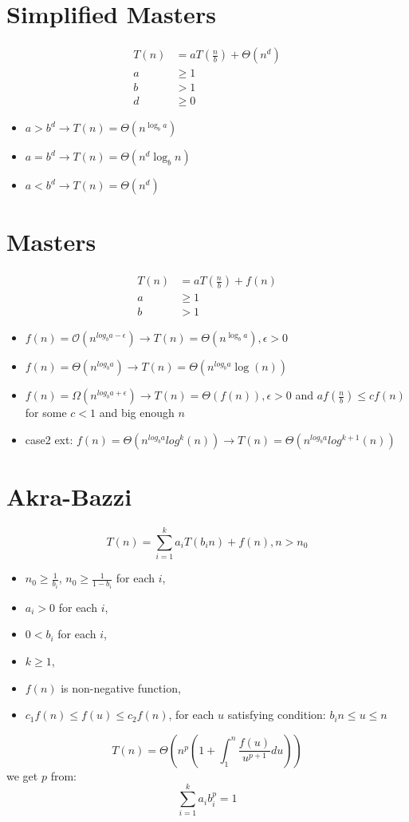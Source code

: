 
 

\begin{multicols}{5}
\setlength{\premulticols}{1pt}
\setlength{\postmulticols}{1pt}
\setlength{\multicolsep}{1pt}
\setlength{\columnsep}{2pt}

\section{Simplified Masters}
\begin{align*}
	T(n) &= aT(\frac{n}{b})+\Theta(n^d) \\
	a &\geq 1 \\
	b &> 1 \\
	d &\geq 0
\end{align*}
\begin{itemize}
	\item $a > b^d \rightarrow T(n) = \Theta(n^{\log_ba})$
	\item $a = b^d \rightarrow T(n) = \Theta(n^d\log_bn)$
	\item $a < b^d \rightarrow T(n) = \Theta(n^d)$
\end{itemize}

\section{Masters}
\begin{align*}
	T(n) &= aT(\frac{n}{b})+f(n) \\
	a &\geq 1 \\
	b &> 1
\end{align*}
\begin{itemize}
	\item $f(n) = \mathcal{O}(n^{log_ba-\epsilon})\rightarrow T(n) = \Theta(n^{\log_ba}), \epsilon > 0$
	\item $f(n) = \Theta(n^{log_ba})\rightarrow T(n) = \Theta(n^{log_ba}\log(n))$
	\item $f(n) = \Omega(n^{log_ba+\epsilon})\rightarrow T(n) = \Theta(f(n)), \epsilon > 0$
		and $af(\frac{n}{b}) \leq cf(n)$ for some $c < 1$ and big enough $n$
	\item case2 ext: $f(n) = \Theta(n^{log_ba}log^k(n)) \rightarrow T(n) = \Theta(n^{log_ba}log^{k+1}(n))$
\end{itemize}


\section{Akra-Bazzi}
\[
	T(n) = \sum_{i=1}^ka_iT(b_in)+f(n), n > n_0
\]
\begin{itemize}
	\item $n_0 \geq \frac{1}{b_i}$, $n_0 \geq \frac{1}{1-b_i}$ for each $i$,
	\item $a_i > 0$ for each $i$,
	\item $0<b_i$ for each $i$,
	\item $k \geq 1$,
	\item $f(n)$ is non-negative function,
	\item $c_1f(n) \leq f(u) \leq c_2f(n)$, for each $u$ satisfying condition: $b_in\leq u\leq n$
\end{itemize}
\[
	T(n) = \Theta(n^p(1+\int_1^n\frac{f(u)}{u^{p+1}}du))
\]
we get $p$ from:
\[
	\sum_{i=1}^ka_ib_i^p=1
\]

\end{multicols}
